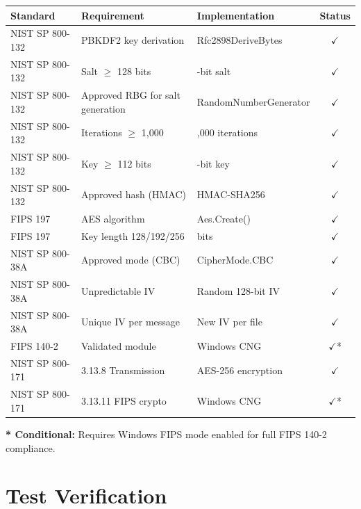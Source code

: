 \documentclass[11pt,letterpaper]{article}
\begin{document}
\small
\begin{longtable}{|>{\raggedright}p{2.8cm}|>{\raggedright}p{4.2cm}|>{\raggedright\arraybackslash}p{4.8cm}|c|}
\hline
\textbf{Standard} & \textbf{Requirement} & \textbf{Implementation} & \textbf{Status} \\
\hline
\endhead

\hline
\endfoot

NIST SP 800-132 & PBKDF2 key derivation & Rfc2898DeriveBytes & $\checkmark$ \\
\hline
NIST SP 800-132 & Salt $\geq$ 128 bits & 128-bit salt & $\checkmark$ \\
\hline
NIST SP 800-132 & Approved RBG for salt generation & RandomNumberGenerator & $\checkmark$ \\
\hline
NIST SP 800-132 & Iterations $\geq$ 1,000 & 100,000 iterations & $\checkmark$ \\
\hline
NIST SP 800-132 & Key $\geq$ 112 bits & 256-bit key & $\checkmark$ \\
\hline
NIST SP 800-132 & Approved hash (HMAC) & HMAC-SHA256 & $\checkmark$ \\
\hline
FIPS 197 & AES algorithm & Aes.Create() & $\checkmark$ \\
\hline
FIPS 197 & Key length 128/192/256 & 256 bits & $\checkmark$ \\
\hline
NIST SP 800-38A & Approved mode (CBC) & CipherMode.CBC & $\checkmark$ \\
\hline
NIST SP 800-38A & Unpredictable IV & Random 128-bit IV & $\checkmark$ \\
\hline
NIST SP 800-38A & Unique IV per message & New IV per file & $\checkmark$ \\
\hline
FIPS 140-2 & Validated module & Windows CNG & $\checkmark$* \\
\hline
NIST SP 800-171 & 3.13.8 Transmission & AES-256 encryption & $\checkmark$ \\
\hline
NIST SP 800-171 & 3.13.11 FIPS crypto & Windows CNG & $\checkmark$* \\
\hline

\end{longtable}
\normalsize

\textbf{* Conditional:} Requires Windows FIPS mode enabled for full FIPS 140-2 compliance.

\section{Test Verification}
\end{document}
